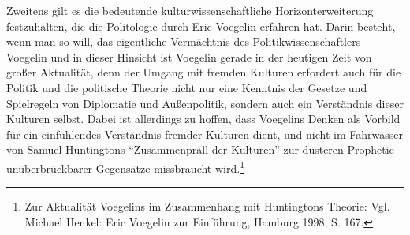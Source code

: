 Zweitens gilt es die bedeutende kulturwissenschaftliche Horizonterweiterung
festzuhalten, die die Politologie durch Eric Voegelin erfahren hat. Darin
besteht, wenn man so will, das eigentliche Vermächtnis des
Politikwissenschaftlers Voegelin und in dieser Hinsicht ist Voegelin gerade in
der heutigen Zeit von großer Aktualität, denn der Umgang mit fremden Kulturen
erfordert auch für die Politik und die politische Theorie nicht nur eine
Kenntnis der Gesetze und Spielregeln von Diplomatie und Außenpolitik, sondern
auch ein Verständnis dieser Kulturen selbst.  Dabei ist allerdings zu hoffen,
dass Voegelins Denken als Vorbild für ein einfühlendes Verständnis fremder
Kulturen dient, und nicht im Fahrwasser von Samuel Huntingtons "`Zusammenprall
der Kulturen"' zur düsteren Prophetie unüberbrückbarer Gegensätze missbraucht
wird.\footnote{Zur Aktualität Voegelins im Zusammenhang mit Huntingtons
  Theorie: Vgl.  Michael Henkel: Eric Voegelin zur Einführung, Hamburg 1998,
  S. 167.}

